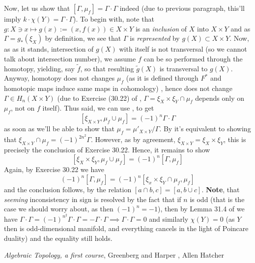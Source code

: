 \documentclass[8pt]{article} %
\begin{document}
\begin{enumerate}[label=\bfseries \arabic*.]
{		Now, let us show that $[\Gamma,\mu_f]=\Gamma\cdot\Gamma$ indeed (due to previous paragraph, this'll imply $k\cdot\chi(Y)=\Gamma\cdot
		\Gamma$). To begin with, note that $g:X\ni x\mapsto g(x):=(x,f(x))\in X\times Y$ is an {\it inclusion} of $X$ into $X\times Y$
		and as $\Gamma=g_*(\xi_X)$ by definition, we see that $\Gamma$ is {\it represented} by $g(X)\subset X\times Y$. Now, as as it stands,
		intersection of $g(X)$ with itself is not transversal (so we cannot talk about intersection number), we assume $f$ can be so
		performed through the homotopy, yielding, say $\widetilde{f}$, so that resulting $\widetilde{g}(X)$ is transversal to $g(X)$. Anyway,
		homotopy does not changes $\mu_f$ (as it is defined through $F^*$ and homotopic maps induce same maps in cohomology)
		, hence does not change $\Gamma\in H_n(X\times Y)$ (due to Exercise (30.22) of \cite{gh}, $\Gamma=\xi_X\times\xi_Y\cap\mu_f$
		depends only on $\mu_f$, not on $f$ itself). Thus said, we can use \cite[Corollary (31.8)]{gh}, to get
		\[[\xi_{X\times Y},\mu_f\cup\mu_f]=(-1)^n\Gamma\cdot\Gamma\]
		as soon as we'll be able to show that $\mu_f=\mu'_{X\times Y}/\Gamma$. By \cite[(30.6)]{gh} it's equivalent to showing that
		$\xi_{X\times Y}\cap\mu_f=(-1)^{2n^2}\Gamma$. However, as by agreement, $\xi_{X\times Y}=\xi_X\times\xi_Y$, this is precisely
		the conclusion of Exercise 30.22. Hence, it remains to show
		\[[\xi_X\times\xi_Y,\mu_f\cup\mu_f]=(-1)^n[\Gamma,\mu_f]\]
		Again, by Exercise 30.22 we have
		\[(-1)^n[\Gamma,\mu_f]=(-1)^n[\xi_x\times\xi_Y\cap\mu_f,\mu_f]\]
		and the conclusion follows, by the relation $[a\cap b,c]=[a,b\cup c]$. {\bf Note}, that {\it seeming} inconsistency in sign is
		resolved by the fact that if $n$ is odd (that is the case we should worry about, as then $(-1)^n=-1$), then by Lemma 31.4 of \cite{gh
		} we have $\Gamma\cdot\Gamma=(-1)^{n^2}\Gamma\cdot\Gamma=-\Gamma\cdot\Gamma\implies\Gamma\cdot\Gamma=0$ and similarly $\chi(Y)=0$
		(as $Y$ then is odd-dimensional manifold, and everything cancels in the light of Poincare duality) and the equality still holds.
		}
\end{enumerate}
\begin{thebibliography}{9}
	 {\em Algebraic Topology, a first course}, Greenberg and Harper
	, Allen Hatcher
\end{thebibliography}
\end{document}
